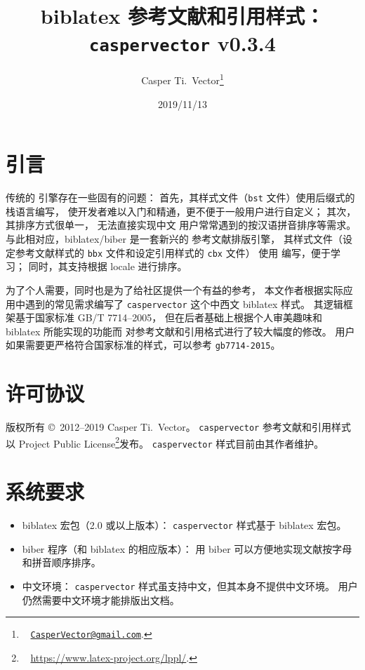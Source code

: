 \documentclass[UTF8]{ctexart}
\newcommand*{\cupercite}[1]{\supercite{#1}\mbox{}}
\begin{document}
\title{\textbf{biblatex 参考文献和引用样式：\texttt{caspervector} v0.3.4}}
\author{%
	Casper Ti.\ Vector\thanks{\ %
		\href{mailto:CasperVector@gmail.com}{\texttt{CasperVector@gmail.com}}.%
	}%
}
\date{2019/11/13}
\maketitle

\section{引言}

传统的  引擎存在一些固有的问题：
首先，其样式文件（\verb|bst| 文件）使用后缀式的栈语言编写，
使开发者难以入门和精通，更不便于一般用户进行自定义；
其次，其排序方式很单一，
无法直接实现中文  用户常常遇到的按汉语拼音排序等需求。
与此相对应，biblatex\cupercite{biblatex}/biber\cupercite{biber}
是一套新兴的  参考文献排版引擎，
其样式文件（设定参考文献样式的 \verb|bbx| 文件和设定引用样式的 \verb|cbx| 文件）
使用  编写，便于学习；
同时，其支持根据 locale 进行排序。

为了个人需要，同时也是为了给社区提供一个有益的参考，
本文作者根据实际应用中遇到的常见需求编写了
\verb|caspervector| 这个中西文 biblatex 样式。
其逻辑框架基于国家标准 GB/T 7714--2005\cupercite{gbt7714-2005}，
但在后者基础上根据个人审美趣味和 biblatex 所能实现的功能而
对参考文献和引用格式进行了较大幅度的修改。
用户如果需要更严格符合国家标准的样式，可以参考
\verb|gb7714-2015|\cupercite{blx-gb7714-2015}。

\section{许可协议}

版权所有 \copyright\ 2012--2019 Casper Ti.\ Vector。%
\verb|caspervector| 参考文献和引用样式以
 Project Public License\footnote{\ %
	\url{https://www.latex-project.org/lppl/}.%
}发布。%
\verb|caspervector| 样式目前由其作者维护。

\section{系统要求}

\begin{itemize}
	\item biblatex 宏包（2.0 或以上版本）：%
		\verb|caspervector| 样式基于 biblatex 宏包。
	\item biber 程序（和 biblatex 的相应版本）：
		用 biber 可以方便地实现文献按字母和拼音顺序排序。
	\item 中文环境：%
		\verb|caspervector| 样式虽支持中文，但其本身不提供中文环境。
		用户仍然需要中文环境才能排版出文档。
\end{itemize}
\end{document}
